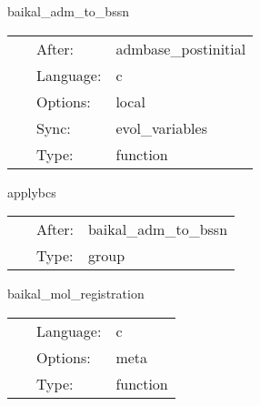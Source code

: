 \vspace{5mm}


\hspace{5mm} baikal\_adm\_to\_bssn 

\hspace{5mm}{\it convert initial data into bssn variables } 


\hspace{5mm}

 \begin{tabular*}{160mm}{cll} 
~ & After:  & admbase\_postinitial \\ 
~ & Language:  & c \\ 
~ & Options:  & local \\ 
~ & Sync:  & evol\_variables \\ 
~ & Type:  & function \\ 
\end{tabular*} 


\vspace{5mm}


\hspace{5mm} applybcs 

\hspace{5mm}{\it apply boundary conditions } 


\hspace{5mm}

 \begin{tabular*}{160mm}{cll} 
~ & After:  & baikal\_adm\_to\_bssn \\ 
~ & Type:  & group \\ 
\end{tabular*} 


\vspace{5mm}


\hspace{5mm} baikal\_mol\_registration 

\hspace{5mm}{\it register variables for mol } 


\hspace{5mm}

 \begin{tabular*}{160mm}{cll} 
~ & Language:  & c \\ 
~ & Options:  & meta \\ 
~ & Type:  & function \\ 
\end{tabular*} 


